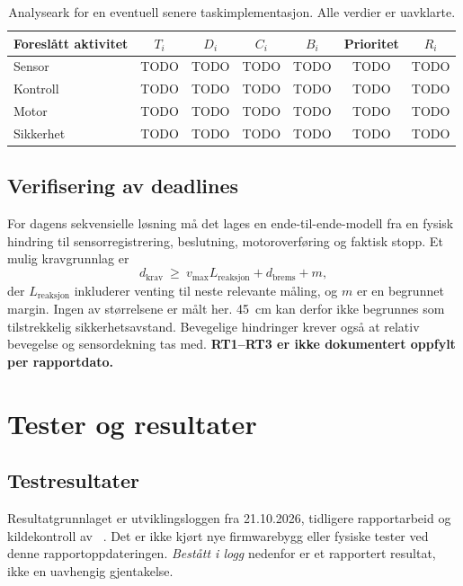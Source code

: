 \documentclass[a4paper,11pt,oneside]{report}
\newcommand{\kode}[1]{\begingroup
 \sbox0{\texttt{\detokenize{#1}}}%
 \ifdim\wd0>150pt\relax
  {\urlstyle{tt}\expandafter\nolinkurl\expandafter{\detokenize{#1}}}%
 \else\usebox0\fi\endgroup}
\begin{document}
\begin{table}[htbp]
\small
\begin{tabularx}{\textwidth}{@{}Ycccccc@{}}
\toprule Foreslått aktivitet & $T_i$ & $D_i$ & $C_i$ & $B_i$ & Prioritet & $R_i$\\\midrule
Sensor & TODO & TODO & TODO & TODO & TODO & TODO\\
Kontroll & TODO & TODO & TODO & TODO & TODO & TODO\\
Motor & TODO & TODO & TODO & TODO & TODO & TODO\\
Sikkerhet & TODO & TODO & TODO & TODO & TODO & TODO\\
\bottomrule
\end{tabularx}
\caption{Analyseark for en eventuell senere taskimplementasjon. Alle verdier er uavklarte.}
\label{tab:rta}
\end{table}

\section{Verifisering av deadlines}
For dagens sekvensielle løsning må det lages en ende-til-ende-modell fra
en fysisk hindring til sensorregistrering, beslutning, motoroverføring og
faktisk stopp. Et mulig kravgrunnlag er
\begin{equation}
d_{\mathrm{krav}}\ \geq\ v_{\max}L_{\mathrm{reaksjon}}+
d_{\mathrm{brems}}+m,
\label{eq:stopp}
\end{equation}
der $L_{\mathrm{reaksjon}}$ inkluderer venting til neste relevante måling,
og $m$ er en begrunnet margin. Ingen av størrelsene er målt her.
45~cm kan derfor ikke begrunnes som tilstrekkelig sikkerhetsavstand.
Bevegelige hindringer krever også at relativ bevegelse og sensordekning
tas med. \textbf{RT1--RT3 er ikke dokumentert oppfylt per rapportdato.}

\chapter{Tester og resultater}\label{ch:test}
\section{Testresultater}
Resultatgrunnlaget er utviklingsloggen fra 21.10.2026, tidligere rapportarbeid
og kildekontroll av \kode{ee6df67}~\cite{logg,tidligere,kode}.
Det er ikke kjørt nye firmwarebygg eller fysiske tester ved denne
rapportoppdateringen. \emph{Bestått i logg} nedenfor er et rapportert resultat,
ikke en uavhengig gjentakelse.
\end{document}

